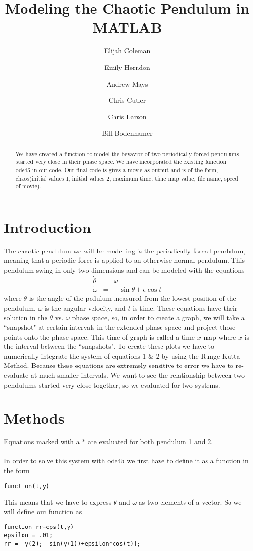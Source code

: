 \documentclass{article}
\title{Modeling the Chaotic Pendulum in MATLAB}
\author{Elijah Coleman \and Emily Herndon \and Andrew Mays \and Chris Cutler \and Chris Larson \and Bill Bodenhamer}
\date{}
\begin{document}
\maketitle
\begin{abstract}
We have created a function to model the bevavior of two periodically forced pendulums started very close in their phase space. We have incorporated the existing function ode45 in our code. Our final code is gives a movie as output and is of the form, chaos(initial values 1, initial values 2, maximum time, time map value, file name, speed of movie).
\end{abstract}
\section{Introduction}
The chaotic pendulum we will be modelling is the periodically forced pendulum, meaning that a periodic force is applied to an otherwise normal pendulum. This pendulum swing in only two dimensions and can be modeled with the equations
\begin{eqnarray}
\dot{\theta}&=&\omega \\
\dot{\omega}&=&-\sin{\theta} + \epsilon \cos{t}
\end{eqnarray}
where $\theta$ is the angle of the pedulum measured from the lowest position of the pendulum, $\omega$ is the angular velocity, and $t$ is time. 
These equations have their solution in the $\theta$ vs. $\omega$ phase space, so, in order to create a graph, we will take a ``snapshot" at certain intervals in the extended phase space and project those points onto the phase space. This time of graph is called a time $x$ map where $x$ is the interval between the ``snapshots". To create these plots we have to numerically integrate the system of equations 1 \& 2 by using the Runge-Kutta Method. Because these equations are extremely sensitive to error we have to re-evaluate at much smaller intervals. We want to see the relationship between two pendulums started very close together, so we evaluated for two systems.


\section{Methods}
Equations marked with a $*$ are evaluated for both pendulum 1 and 2. \\ \\
In order to solve this system with ode45 we first have to define it as a function in the form \\
\begin{center}
\texttt{function(t,y)}
\end{center}
This means that we have to express $\theta$ and $\omega$ as two elements of a vector. So we will define our function as \\
\begin{center}
\texttt{function  rr=cps(t,y) \\
epsilon = .01;  \\
rr = [y(2); -sin(y(1))+epsilon*cos(t)];}
\end{center}
\end{document}
